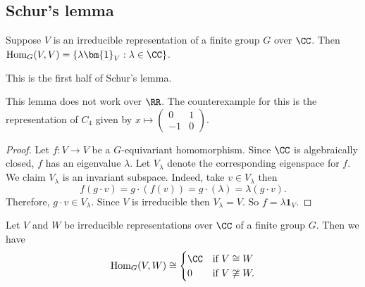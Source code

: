 \documentclass[12pt, a4paper]{article}
\begin{document}
\subsection{Schur's lemma}

\begin{lemma}
    Suppose \(V\) is an irreducible representation of a finite group \(G\) over \(\CC\). Then \(\text{Hom}_G(V,V)=\left\{ \lambda \bm{1}_V : \lambda\in \CC \right\}\).
\end{lemma}

\begin{mdnote}
    This is the first half of Schur's lemma.
\end{mdnote}

\begin{mdremark}
    This lemma does not work over \(\RR\). The counterexample for this is the representation of \(C_4\) given by \(x \mapsto \begin{pmatrix}
        0 & 1 \\
        -1 & 0 
    \end{pmatrix}\).
\end{mdremark}

\begin{proof}
    Let \(f:V \to V\) be a \(G\)-equivariant homomorphism. Since \(\CC\) is algebraically closed, \(f\) has an eigenvalue \(\lambda\). Let \(V_{\lambda}\) denote the corresponding eigenspace for \(f\). We claim \(V_{\lambda}\) is an invariant subspace. Indeed, take \(v\in V_{\lambda}\) then 
    \[f(g\cdot v)=g\cdot (f(v))=g\cdot(\lambda) =\lambda(g\cdot v).\]
    Therefore, \(g\cdot v\in V_{\lambda}\). Since \(V\) is irreducible then \(V_{\lambda}=V\). So \(f=\lambda \bm{1}_V\).
\end{proof}

\begin{mdthm}
    Let \(V\) and \(W\) be irreducible representations over \(\CC\) of a finite group \(G\). Then we have 
    \[\text{Hom}_G(V,W) \cong \begin{cases}
        \CC &\text{if } V \cong W\\
        0 &\text{if } V \not\cong W.
    \end{cases}\]
\end{mdthm}
\end{document}
